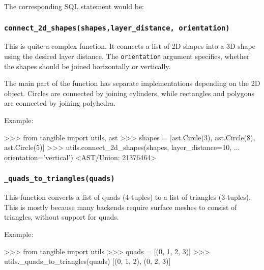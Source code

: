 \noindent The corresponding SQL statement would be:

\vspace{.5\baselineskip}




\subsubsection{\texttt{connect\_2d\_shapes(shapes,layer\_distance, orientation)}}

This is quite a complex function. It connects a list of 2D shapes into a 3D
shape using the desired layer distance. The \texttt{orientation} argument
specifies, whether the shapes should be joined horizontally or vertically.

\noindent The main part of the function has separate implementations depending
on the 2D object. Circles are connected by joining cylinders, while rectangles
and polygons are connected by joining polyhedra.

\vspace{.5\baselineskip}

\noindent Example:

\vspace{.5\baselineskip}
\begin{pythoncode}
>>> from tangible import utils, ast
>>> shapes = [ast.Circle(3), ast.Circle(8), ast.Circle(5)]
>>> utils.connect_2d_shapes(shapes, layer_distance=10,
...     orientation='vertical')
<AST/Union: 21376464>
\end{pythoncode}


\subsubsection{\texttt{\_quads\_to\_triangles(quads)}}

This function converts a list of quads (4-tuples) to a list of triangles
(3-tuples). This is mostly because many backends require surface meshes to
consist of triangles, without support for quads.

\vspace{.5\baselineskip}

\noindent Example:

\vspace{.5\baselineskip}
\begin{pythoncode}
>>> from tangible import utils
>>> quads = [(0, 1, 2, 3)]
>>> utils._quads_to_triangles(quads)
[(0, 1, 2), (0, 2, 3)]
\end{pythoncode}

